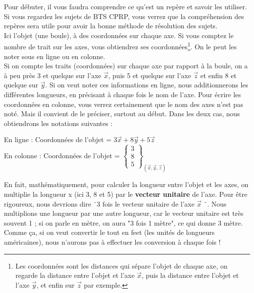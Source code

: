 \documentclass[
	11pt, %
	fleqn, %
	a4paper, %
]{LegrandOrangeBook}
\begin{document}
Pour débuter, il vous faudra comprendre ce qu'est un repère et savoir les utiliser. Si vous regardez les sujets de BTS CPRP, vous verrez que la compréhension des repères sera utile pour avoir la bonne méthode de résolution des sujets.\\


Ici l'objet (une boule), à des coordonnées sur chaque axe. Si vous comptez le {\color{blue} nombre de trait} sur les axes, vous obtiendrez ses coordonnées\footnote{Les coordonnées sont les distances qui sépare l'objet de chaque axe, on regarde la distance entre l'objet et l'axe $\vec{x}$, puis la distance entre l'objet et l'axe $\vec{y}$, et enfin sur $\vec{z}$ par exemple.}. On le peut les noter sous en ligne ou en colonne.\\


Si on compte les traits (coordonnées) sur chaque axe par rapport à la boule, on a à peu près 3 et quelque sur l'axe $\vec{x}$, puis 5 et quelque sur l'axe $\vec{z}$ et enfin 8 et quelque sur $\vec{y}$. Si on veut noter ces informations en ligne, nous additionnerons les différentes longueurs, en précisant à chaque fois le nom de l'axe. Pour écrire les coordonnées en colonne, vous verrez certainement que le nom des axes n'est pas noté. Mais il convient de le préciser, surtout au début. Dans les deux cas, nous obtiendrons les notations suivantes :

\begin{center}
    

En ligne : Coordonnées de l'objet = $3\vec{x} + 8\vec{y} + 5\vec{z}$ \\
En colonne : Coordonnées de l'objet = $ \left\{ \begin{array}{c}
     3 \\
     8 \\
     5
\end{array} \right\} _{(\vec{x}, \vec{y}, \vec{z})}$
\end{center}

\begin{remark}
    En fait, mathématiquement, pour calculer la longueur entre l'objet et les axes, on multiplie la longueur x (ici 3, 8 et 5) par le \textbf{vecteur unitaire} de l'axe. Pour être rigoureux, nous devrions dire ¨3 fois le vecteur unitaire de l'axe $\vec{x}$ ¨. Nous multiplions une longueur par une autre longueur, car le vecteur unitaire est très souvent 1 ; si on parle en mètre, on aura "3 fois 1 mètre", ce qui donne 3 mètre. Comme ça, si on veut convertir le tout en feet (les unités de longueurs américaines), nous n'aurons pas à effectuer les conversion à chaque fois ! 
\end{remark}
\end{document}
